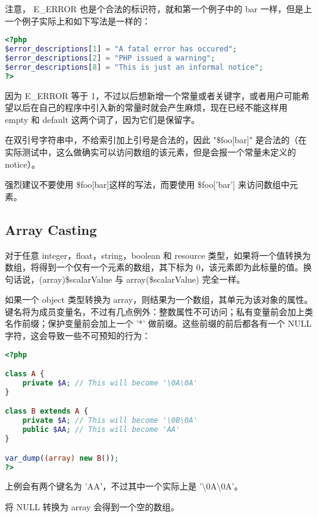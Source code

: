 注意， E\_ERROR 也是个合法的标识符，就和第一个例子中的 bar 一样，但是上一个例子实际上和如下写法是一样的：



\begin{lstlisting}[language=PHP]
<?php
$error_descriptions[1] = "A fatal error has occured";
$error_descriptions[2] = "PHP issued a warning";
$error_descriptions[8] = "This is just an informal notice";
?>
\end{lstlisting}

因为 E\_ERROR 等于 1，不过以后想新增一个常量或者关键字，或者用户可能希望以后在自己的程序中引入新的常量时就会产生麻烦，现在已经不能这样用 empty 和 default 这两个词了，因为它们是保留字。

在双引号字符串中，不给索引加上引号是合法的，因此 "\$foo[bar]" 是合法的（在实际测试中，这么做确实可以访问数组的该元素，但是会报一个常量未定义的 notice）。

强烈建议不要使用 \$foo[bar]这样的写法，而要使用 \$foo['bar'] 来访问数组中元素。


\subsection{Array Casting}

对于任意 integer，float，string，boolean 和 resource 类型，如果将一个值转换为数组，将得到一个仅有一个元素的数组，其下标为 0，该元素即为此标量的值。换句话说，(array)\$scalarValue 与 array(\$scalarValue) 完全一样。

如果一个 object 类型转换为 array，则结果为一个数组，其单元为该对象的属性。键名将为成员变量名，不过有几点例外：整数属性不可访问；私有变量前会加上类名作前缀；保护变量前会加上一个 '*' 做前缀。这些前缀的前后都各有一个 NULL 字符，这会导致一些不可预知的行为：







\begin{lstlisting}[language=PHP]
<?php

class A {
    private $A; // This will become '\0A\0A'
}

class B extends A {
    private $A; // This will become '\0B\0A'
    public $AA; // This will become 'AA'
}

var_dump((array) new B());
?>
\end{lstlisting}

上例会有两个键名为 'AA'，不过其中一个实际上是 '\textbackslash 0A\textbackslash 0A'。

将 NULL 转换为 array 会得到一个空的数组。


